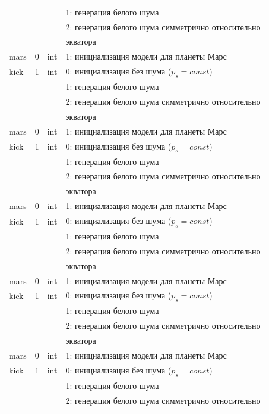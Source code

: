\begin{longtable*}[c]{|l|c|l|l|}
    &   &     & 1: генерация белого шума                  \\
    &   &     & 2: генерация белого шума симметрично относительно \\
    & & & экватора    \\
    mars & 0 & int & 1: инициализация модели для планеты Марс     \\
    kick & 1 & int & 0: инициализация без шума (\(p_s = const\)) \\
    &   &     & 1: генерация белого шума                  \\
    &   &     & 2: генерация белого шума симметрично относительно \\
    & & & экватора    \\
    mars & 0 & int & 1: инициализация модели для планеты Марс     \\
    kick & 1 & int & 0: инициализация без шума (\(p_s = const\)) \\
    &   &     & 1: генерация белого шума                  \\
    &   &     & 2: генерация белого шума симметрично относительно \\
    & & & экватора    \\
    mars & 0 & int & 1: инициализация модели для планеты Марс     \\
    kick & 1 & int & 0: инициализация без шума (\(p_s = const\)) \\
    &   &     & 1: генерация белого шума                  \\
    &   &     & 2: генерация белого шума симметрично относительно \\
    & & & экватора    \\
    mars & 0 & int & 1: инициализация модели для планеты Марс     \\
    kick & 1 & int & 0: инициализация без шума (\(p_s = const\)) \\
    &   &     & 1: генерация белого шума                  \\
    &   &     & 2: генерация белого шума симметрично относительно \\
    & & & экватора    \\
    mars & 0 & int & 1: инициализация модели для планеты Марс     \\
    kick & 1 & int & 0: инициализация без шума (\(p_s = const\)) \\
    &   &     & 1: генерация белого шума                  \\
    &   &     & 2: генерация белого шума симметрично относительно \\

\end{longtable*}
